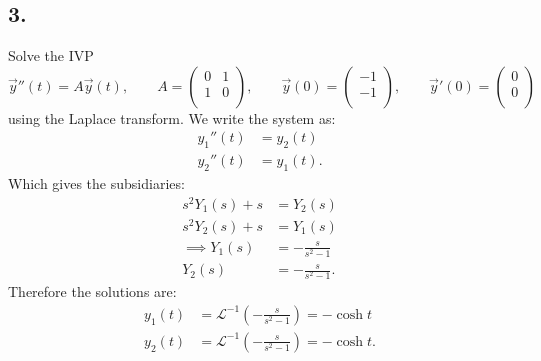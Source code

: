 \subsection*{3.} Solve the IVP
\[ 
\Vec{y}''(t) = A \Vec{y}(t), \qquad A = \begin{pmatrix}
0 & 1\\
1 &0\\
\end{pmatrix}, \qquad \Vec{y}(0) = \begin{pmatrix}
-1\\
-1\\
\end{pmatrix}, \qquad \Vec{y}'(0) = \begin{pmatrix}
0\\
0\\
\end{pmatrix}
\]
using the Laplace transform.
\bigbreak
We write the system as:
\begin{align*}
  y_1''(t) &= y_2(t) \\
  y_2''(t) &= y_1(t)
.\end{align*}
Which gives the subsidiaries:
\begin{align*}
  s^2 Y_1(s) + s &= Y_2(s) \\
  s^2 Y_2(s) + s &= Y_1(s) \\
  \implies Y_1(s) &= - \frac{s}{s^2 - 1} \\
  Y_2(s) &= - \frac{s}{s^2 - 1}
.\end{align*}
Therefore the solutions are:
\begin{align*}
  y_1(t) &= \mathcal{L}^{-1} \left( - \frac{s}{s^2 - 1} \right) = - \cosh t \\
  y_2 (t) &= \mathcal{L}^{-1} \left( - \frac{s}{s^2 - 1} \right) = - \cosh t
.\end{align*}




